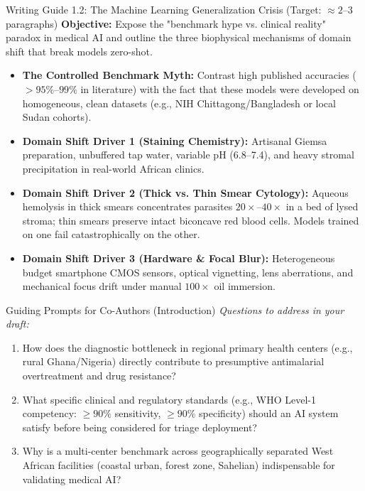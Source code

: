 \documentclass[a4paper,11pt]{article}
\begin{document}
\begin{guidebox}{Writing Guide 1.2: The Machine Learning Generalization Crisis (Target: $\approx 2$--$3$ paragraphs)}
\textbf{Objective:} Expose the "benchmark hype vs. clinical reality" paradox in medical AI and outline the three biophysical mechanisms of domain shift that break models zero-shot.
\begin{itemize}\itemsep1.5pt
    \item \textbf{The Controlled Benchmark Myth:} Contrast high published accuracies ($>95\%\text{--}99\%$ in literature) with the fact that these models were developed on homogeneous, clean datasets (e.g., NIH Chittagong/Bangladesh or local Sudan cohorts).
    \item \textbf{Domain Shift Driver 1 (Staining Chemistry):} Artisanal Giemsa preparation, unbuffered tap water, variable pH (6.8--7.4), and heavy stromal precipitation in real-world African clinics.
    \item \textbf{Domain Shift Driver 2 (Thick vs. Thin Smear Cytology):} Aqueous hemolysis in thick smears concentrates parasites $20\times\text{--}40\times$ in a bed of lysed stroma; thin smears preserve intact biconcave red blood cells. Models trained on one fail catastrophically on the other.
    \item \textbf{Domain Shift Driver 3 (Hardware \& Focal Blur):} Heterogeneous budget smartphone CMOS sensors, optical vignetting, lens aberrations, and mechanical focus drift under manual $100\times$ oil immersion.
\end{itemize}
\end{guidebox}

\begin{promptbox}{Guiding Prompts for Co-Authors (Introduction)}
\textit{Questions to address in your draft:}
\begin{enumerate}\itemsep2pt
    \item How does the diagnostic bottleneck in regional primary health centers (e.g., rural Ghana/Nigeria) directly contribute to presumptive antimalarial overtreatment and drug resistance?
    \item What specific clinical and regulatory standards (e.g., WHO Level-1 competency: $\ge 90\%$ sensitivity, $\ge 90\%$ specificity) should an AI system satisfy before being considered for triage deployment?
    \item Why is a multi-center benchmark across geographically separated West African facilities (coastal urban, forest zone, Sahelian) indispensable for validating medical AI?
\end{enumerate}
\end{promptbox}
\end{document}
